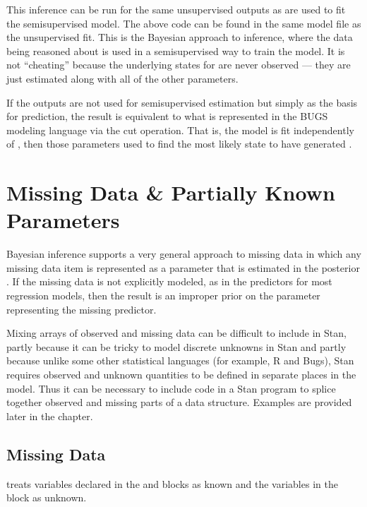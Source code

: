 This inference can be run for the same unsupervised outputs 
as are used to fit the semisupervised model.  The above code can be
found in the same model file as the unsupervised fit.  This is the
Bayesian approach to inference, where the data being reasoned about is
used in a semisupervised way to train the model.  It is not
``cheating'' because the underlying states for  are never
observed --- they are just estimated along with all of the other
parameters.

If the outputs  are not used for semisupervised estimation but
simply as the basis for prediction, the result is equivalent to what
is represented in the BUGS modeling language via the cut operation.
That is, the model is fit independently of , then those
parameters used to find the most likely state to have generated
.





\chapter{Missing Data \& Partially Known Parameters}

\noindent
Bayesian inference supports a very general approach to missing data in
which any missing data item is represented as a parameter that is
estimated in the posterior \citep{GelmanEtAl:2013}.  If the missing
data is not explicitly modeled, as in the predictors for most
regression models, then the result is an improper prior on the
parameter representing the missing predictor.

Mixing arrays of observed and missing data can be difficult to
include in Stan, partly because it can be tricky to model discrete
unknowns in Stan and partly because unlike some other statistical
languages (for example, R and Bugs), Stan requires observed and
unknown quantities to be defined in separate places in the model. Thus
it can be necessary to include code in a Stan program to splice
together observed and missing parts of a data structure.  Examples are
provided later in the chapter.

\section{Missing Data}

\Stan treats variables declared in the  and
 blocks as known and the variables in the
 block as unknown.

